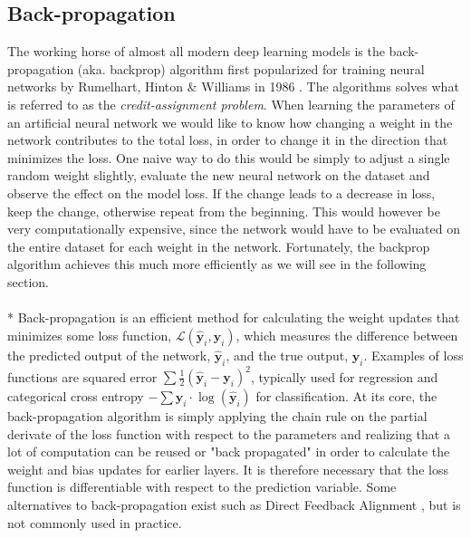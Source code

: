 \documentclass[a4paper,11pt]{article} %
\begin{document}
\subsection{Back-propagation}
\label{sec:backprop}
The working horse of almost all modern deep learning models is the back-propagation (aka. backprop) algorithm first popularized for training neural networks by Rumelhart, Hinton \& Williams in 1986 \cite{rumelhart1986learning}. The algorithms solves what is referred to as the \textit{credit-assignment problem}. When learning the parameters of an artificial neural network we would like to know how changing a weight in the network contributes to the total loss, in order to change it in the direction that minimizes the loss. One naive way to do this would be simply to adjust a single random weight slightly, evaluate the new neural network on the dataset and observe the effect on the model loss. If the change leads to a decrease in loss, keep the change, otherwise repeat from the beginning. This would however be very computationally expensive, since the network would have to be evaluated on the entire dataset for each weight in the network. Fortunately, the backprop algorithm achieves this much more efficiently as we will see in the following section. \\
\\*
Back-propagation is an efficient method for calculating the weight updates that minimizes some loss function, $\mathcal{L}(\hat{\mathbf{y}}_i, \mathbf{y}_i)$, which measures the difference between the predicted output of the network, $\hat{\mathbf{y}}_i$, and the true output, $\mathbf{y}_i$. Examples of loss functions are squared error $\sum{\frac{1}{2}(\hat{\mathbf{y}}_i - \mathbf{y}_i)^2}$, typically used for regression and categorical cross entropy $-\sum{\mathbf{y}_i \cdot \log(\hat{\mathbf{y}}_i)}$ for classification. At its core, the back-propagation algorithm is simply applying the chain rule on the partial derivate of the loss function with respect to the parameters and realizing that a lot of computation can be reused or "back propagated" in order to calculate the weight and bias updates for earlier layers. It is therefore necessary that the loss function is differentiable with respect to the prediction variable. Some alternatives to back-propagation exist such as Direct Feedback Alignment \cite{noekland2016direct}, but is not commonly used in practice.  
\end{document}
